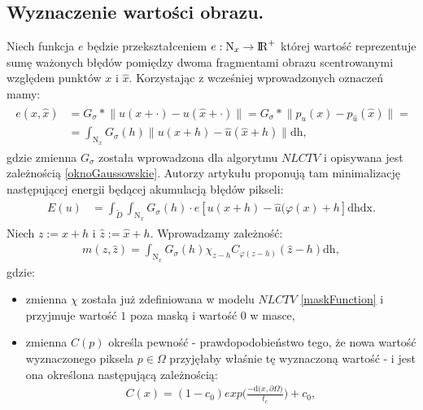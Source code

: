 \documentclass[a4paper,12pt,twoside,openany]{report}
\begin{document}
\subsection{Wyznaczenie wartości obrazu.}
Niech funkcja $e$  będzie przekształceniem $e: \mathrm{N}_x \rightarrow {\rm I\!R}^{+}$ której wartość reprezentuje sumę ważonych błędów pomiędzy dwoma fragmentami obrazu scentrowanymi względem punktów $x$ i $\hat{x}$. Korzystając z wcześniej wprowadzonych oznaczeń mamy:
\begin{align}
\begin{aligned}
e(x, \hat{x}) &= G_\sigma \ast \big\| u(x + \cdot) - u(\hat{x} + \cdot) \big\| = G_\sigma \ast \big\| p_{u}(x) - p_{\hat{u}}(\hat{x}) \big\| = \\ 
&= \int_{\mathrm{N}_x} G_\sigma(h) \big\| u(x+h) - \hat{u}(\hat{x} +h) \big\|\mathrm{dh},
\label{minUs}
\end{aligned}
\end{align}
gdzie zmienna $G_{\sigma}$ została wprowadzona dla algorytmu $NLCTV$ i opisywana jest zależnością \eqref{oknoGaussowskie}. Autorzy artykułu \cite{arias2011variational} proponują tam minimalizację następującej energii będącej akumulacją błędów pikseli:
\begin{align}
\begin{aligned}
E(u) &= \int_{\widetilde D}\int_{\mathrm{N}_x}G_\sigma(h)\cdot e \left[ u(x+h) - \hat{u}(\varphi(x)+h\right]\mathrm{dhdx}.
\label{patchMatchEnergy}
\end{aligned}
\end{align} 
Niech $z := x+h$ i $\hat{z} := \hat{x}+h$. Wprowadzamy zależność:
\begin{align}
m(z,\hat{z}) = \int_{\mathrm{N}_x}G_\sigma(h)\chi_{z-h}C_{\varphi(z-h)}(\hat{z}-h)\mathrm{dh},
\end{align}
gdzie:
\begin{itemize}
\item
zmienna $\chi$ została już zdefiniowana w modelu $NLCTV$ \eqref{maskFunction} i przyjmuje wartość $1$ poza maską i wartość $0$ w masce,
\item
zmienna $C(p)$ określa pewność - prawdopodobieństwo tego, że nowa wartość wyznaczonego piksela $p \in \Omega$ przyjęłaby właśnie tę wyznaczoną wartość - i jest ona określona następującą zależnością:
\begin{align}
C(x)=(1-c_0)exp\bigg(\frac{-\mathrm{d}\bigl(x,\partial\Omega\bigr)}{t_c}\bigg) + c_0,
\label{pewnoscVFI}
\end{align}
\end{itemize}
\end{document}
